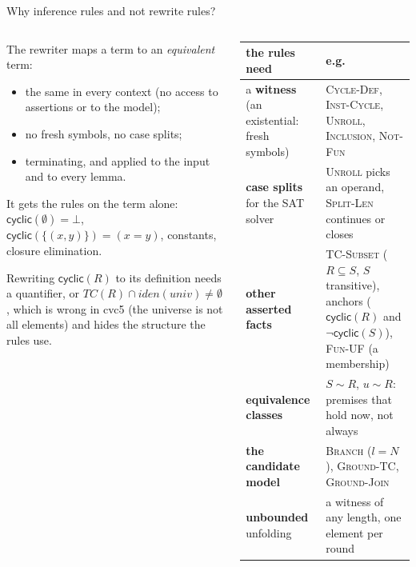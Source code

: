 \documentclass[aspectratio=169]{beamer}
\newcommand{\TC}{\mathit{TC}}
\newcommand{\cyc}[1]{\mathsf{cyclic}(#1)}
\newcommand{\rn}[1]{\textsc{#1}}
\begin{document}
\begin{frame}{Why inference rules and not rewrite rules?}
  \footnotesize
  \begin{columns}[T]
  \begin{column}{0.4\textwidth}
    \begin{block}{The rewriter}
      maps a term to an \emph{equivalent} term:
      \begin{itemize}
        \item the same in every context (no access to assertions or to the model);
        \item no fresh symbols, no case splits;
        \item terminating, and applied to the input and to every lemma.
      \end{itemize}
      It gets the rules on the term alone: $\cyc{\emptyset}=\bot$,
      $\cyc{\{(x,y)\}} = (x=y)$, constants, closure elimination.
    \end{block}
    Rewriting $\cyc{R}$ to its definition needs a quantifier, or
    $\TC(R)\cap\mathit{iden}(\mathit{univ})\ne\emptyset$, which is wrong in cvc5 (the universe
    is not all elements) and hides the structure the rules use.
  \end{column}
  \begin{column}{0.58\textwidth}
    \scriptsize
    \begin{tabular}{@{}L{3.0cm}L{5.0cm}@{}}
      \toprule
      the rules need & e.g. \\
      \midrule
      a \textbf{witness} (an existential: fresh symbols) & \rn{Cycle-Def}, \rn{Inst-Cycle},
        \rn{Unroll}, \rn{Inclusion}, \rn{Not-Fun} \\
      \textbf{case splits} for the SAT solver & \rn{Unroll} picks an operand,
        \rn{Split-Len} continues or closes \\
      \textbf{other asserted facts} & \rn{TC-Subset} ($R\subseteq S$, $S$ transitive),
        anchors ($\cyc{R}$ and $\neg\cyc{S}$), \rn{Fun-UF} (a membership) \\
      \textbf{equivalence classes} & $S \sim R$, $u\sim R$: premises that hold now, not always \\
      \textbf{the candidate model} & \rn{Branch} ($l = N$), \rn{Ground-TC}, \rn{Ground-Join} \\
      \textbf{unbounded} unfolding & a witness of any length, one element per round \\
      \bottomrule
    \end{tabular}
  \end{column}
  \end{columns}
\end{frame}
\end{document}
